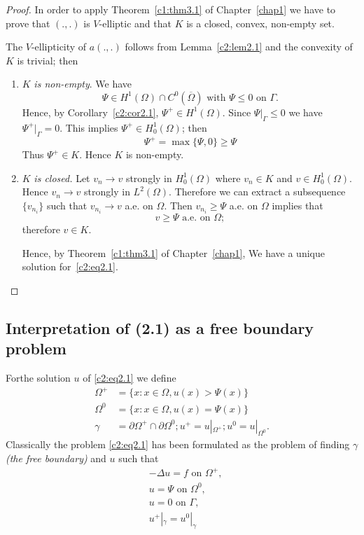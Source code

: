 \begin{proof}
In order to apply Theorem~\ref{c1:thm3.1} of Chapter~\ref{chap1} we have to prove that
$(.,.)$ is $V$-elliptic and that $K$ is a closed, convex, non-empty
set.  
  
The $V$-ellipticity of $a(. , .)$ follows from Lemma~\ref{c2:lem2.1} and the
convexity of $K$ is trivial; then 
\begin{enumerate}[(1)]
\item $K$ \textit{ is non-empty}. We have 
$$
\Psi \in H^ 1(\Omega) \cap C^0 (\overline{\Omega}) \text{ with }
\Psi \leq 0 \text{ on } \Gamma. 
$$
Hence, by Corollary~\ref{c2:cor2.1}, $\Psi^+ \in H^1 (\Omega)$. Since $\Psi |
_\Gamma \leq 0$ we have $\Psi^+ |_\Gamma = 0$. This implies $\Psi^+
\in H^1_0 (\Omega)$; then  
$$
\Psi^+ = \max \{\Psi, 0 \} \geq \Psi
$$
Thus $\Psi^+ \in K$. Hence $K$ is non-empty.
\item $K$ {\em is closed.} Let $v_n \to v$ strongly in $H^1_0
  (\Omega)$ where $v_n \in K$ and $v \in
  H^1_0(\Omega)$. Hence $v_n \to v$ strongly in
  $L^2(\Omega)$. Therefore we can extract a subsequence $\{v_{n_i}\}$
  such that $v_{n_i} \to v$ a.e. on $\Omega$. Then $v_{n_i} \geq \Psi$
  a.e. on $\Omega$ implies that  
$$
v \geq \Psi \text{ a.e.  on } \Omega ;  
$$
therefore $v \in K$.

Hence, by Theorem~\ref{c1:thm3.1} of Chapter~\ref{chap1}, We have a
unique solution for~\eqref{c2:eq2.1}. 
\end{enumerate} 
\end{proof}
 
\subsection{Interpretation of (2.1) as a free boundary
  problem}\label{c2:2.3}%
 
For\pageoriginale  the solution $u$ of \eqref{c2:eq2.1} we define  
\begin{align*}
\Omega^+  & = \{x : x \in \Omega, u (x) > \Psi (x)\}\\
\Omega^0 & =  \{x : x \in \Omega, u (x) = \Psi (x) \}\\
\gamma & = \partial \Omega^+ \cap \partial \Omega^0 ; u^+ =
u|_{\Omega^+} ; u^0 = u|_{\Omega ^0}. 
\end{align*}
Classically the problem \eqref{c2:eq2.1} has been formulated as the
problem of 
finding $\gamma$ \textit{(the free boundary)} and $u$ such that  
\begin{align}
&-\Delta u = f \text{ on } \Omega^+, \tag{2.3}\label{c2:eq2.3}\\
&u = \Psi \text{ on }\Omega^0, \tag{2.4}\label{c2:eq2.4}\\
&u = 0 \text{ on } \Gamma,\tag{2.5}\label{c2:eq2.5}\\
&u^+ |_\gamma = u^0 |_\gamma \tag{2.6}\label{c2:eq2.6}
\end{align} 

